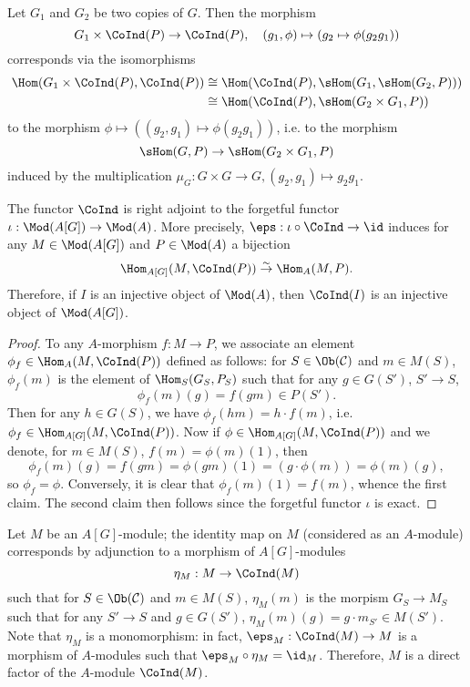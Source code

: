 \begin{remark}
Let $G_1$ and $G_2$ be two copies of $G$. Then the morphism
\[G_1\times \CoInd(P)\to \CoInd(P),\quad (g_1,\phi)\mapsto(g_2\mapsto\phi(g_2g_1))\]
corresponds via the isomorphisms
\begin{align*}
\Hom(G_1\times \CoInd(P),\CoInd(P))&\cong\Hom(\CoInd(P),\sHom(G_1,\sHom(G_2,P)))\\
&\cong\Hom(\CoInd(P),\sHom(G_2\times G_1,P))
\end{align*}
to the morphism $\phi\mapsto((g_2,g_1)\mapsto\phi(g_2g_1))$, i.e. to the morphism
\[\sHom(G,P)\to\sHom(G_2\times G_1,P)\]
induced by the multiplication $\mu_G:G\times G\to G,(g_2,g_1)\mapsto g_2g_1$.
\end{remark}

\begin{lemma}\label{category presheaf group module forgetful CoInd adjoint}
The functor $\CoInd$ is right adjoint to the forgetful functor $\iota:\Mod(A[G])\to\Mod(A)$. More precisely, $\eps:\iota\circ\CoInd\to\id$ induces for any $M\in\Mod(A[G])$ and $P\in\Mod(A)$ a bijection
\[\Hom_{A[G]}(M,\CoInd(P))\stackrel{\sim}{\to} \Hom_A(M,P).\]
Therefore, if $I$ is an injective object of $\Mod(A)$, then $\CoInd(I)$ is an injective object of $\Mod(A[G])$.
\end{lemma}
\begin{proof}
To any $A$-morphism $f:M\to P$, we associate an element $\phi_f\in\Hom_A(M,\CoInd(P))$ defined as follows: for $S\in\Ob(\mathcal{C})$ and $m\in M(S)$, $\phi_f(m)$ is the element of $\Hom_S(G_S,P_S)$ such that for any $g\in G(S')$, $S'\to S$,
\[\phi_f(m)(g)=f(gm)\in P(S').\]
Then for any $h\in G(S)$, we have $\phi_f(hm)=h\cdot f(m)$, i.e. $\phi_f\in\Hom_{A[G]}(M,\CoInd(P))$. Now if $\phi\in\Hom_{A[G]}(M,\CoInd(P))$ and we denote, for $m\in M(S)$, $f(m)=\phi(m)(1)$, then
\[\phi_f(m)(g)=f(gm)=\phi(gm)(1)=(g\cdot\phi(m))=\phi(m)(g),\]
so $\phi_f=\phi$. Conversely, it is clear that $\phi_f(m)(1)=f(m)$, whence the first claim. The second claim then follows since the forgetful functor $\iota$ is exact.
\end{proof}

\begin{definition}\label{category presheaf group module forgetful CoInd unit def}
Let $M$ be an $A[G]$-module; the identity map on $M$ (considered as an $A$-module) corresponds by adjunction to a morphism of $A[G]$-modules
\[\eta_M:M\to \CoInd(M)\]
such that for $S\in\Ob(\mathcal{C})$ and $m\in M(S)$, $\eta_M(m)$ is the morpism $G_S\to M_S$ such that for any $S'\to S$ and $g\in G(S')$, $\eta_M(m)(g)=g\cdot m_{S'}\in M(S')$. Note that $\eta_M$ is a monomorphism: in fact, $\eps_M:\CoInd(M)\to M$ is a morphism of $A$-modules such that $\eps_M\circ\eta_M=\id_M$. Therefore, $M$ is a direct factor of the $A$-module $\CoInd(M)$.
\end{definition}


